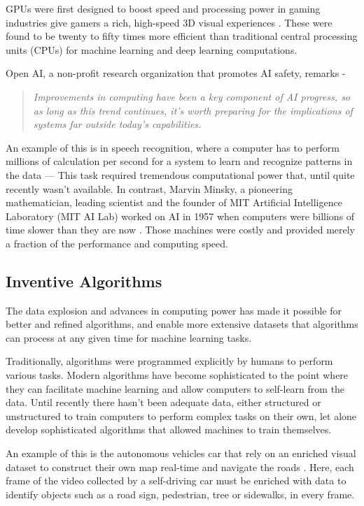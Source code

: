 GPUs were first designed to boost speed and processing power in gaming industries give gamers a rich, high-speed 3D visual experiences \cite{Yosinski2015}. These were found to be twenty to fifty times more efficient than traditional central processing units (CPUs) for machine learning and deep learning computations.

Open AI, a non-profit research organization that promotes AI safety, remarks\cite{aicompute} - \begin{quote}
    \textit{Improvements in computing have been a key component of AI progress, so as long as this trend continues, it’s worth preparing for the implications of systems far outside today’s capabilities.}
\end{quote}

An example of this is in speech recognition, where a computer has to perform millions of calculation per second for a system to learn and recognize patterns in the data — This task required tremendous computational power that, until quite recently wasn't available. In contrast, Marvin Minsky, a pioneering mathematician, leading scientist and the founder of MIT Artificial Intelligence Laboratory (MIT AI Lab) worked on AI in 1957 when computers were billions of time slower than they are now \cite{ubiquitous_ai}. Those machines were costly and provided merely a fraction of the performance and computing speed.

\subsection{Inventive Algorithms}
The data explosion and advances in computing power has made it possible for better and refined algorithms, and enable more extensive datasets that algorithms can process at any given time for machine learning tasks. 

Traditionally, algorithms were programmed explicitly by humans to perform various tasks. Modern algorithms have become sophisticated to the point where they can facilitate machine learning and allow computers to self-learn from the data. Until recently there hasn't been adequate data, either structured or unstructured to train computers to perform complex tasks on their own, let alone develop sophisticated algorithms that allowed machines to train themselves. 

An example of this is the autonomous vehicles car that rely on an enriched visual dataset to construct their own map real-time and navigate the roads \cite{shannon_mattern} \cite{tesla_autopilot}. Here, each frame of the video collected by a self-driving car must be enriched with data to identify objects such as a road sign, pedestrian, tree or sidewalks, in every frame.

